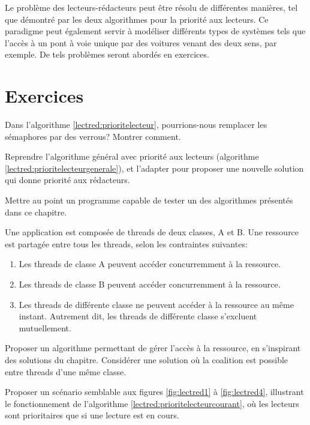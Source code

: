 Le problème des lecteurs-rédacteurs peut être résolu de différentes manières, tel que démontré par les deux algorithmes pour la priorité aux lecteurs. Ce paradigme peut également servir à modéliser différents types de systèmes tels que l'accès à un pont à voie unique par des voitures venant des deux sens, par exemple. De tels problèmes seront abordés en exercices.


\section{Exercices}

\startexercice

Dans l'algorithme \ref{lectred:prioritelecteur}, pourrions-nous remplacer les sémaphores par des verrous? Montrer comment.

\startexercice

Reprendre l'algorithme général avec priorité aux lecteurs (algorithme \ref{lectred:prioritelecteurgenerale}), et l'adapter pour proposer une nouvelle solution qui donne priorité aux rédacteurs.

\startexercice

Mettre au point un programme capable de tester un des algorithmes présentés dans ce chapitre.

\startexercice

Une application est composée de threads de deux classes, A et B. Une ressource est partagée entre tous les threads, selon les contraintes suivantes:
\begin{enumerate}
  \item Les threads de classe A peuvent accéder concurremment  à la ressource.
  \item Les threads de classe B peuvent accéder concurremment à la ressource.
  \item Les threads de différente classe ne peuvent accéder à la ressource au même instant. Autrement dit, les threads de différente classe s'excluent mutuellement.
\end{enumerate}

Proposer un algorithme permettant de gérer l'accès à la ressource, en s'inspirant des solutions du chapitre. Considérer une solution où la coalition est possible entre threads d'une même classe.


\startexercice

Proposer un scénario semblable aux figures \ref{fig:lectred1} à \ref{fig:lectred4}, illustrant le fonctionnement de l'algorithme
\ref{lectred:prioritelecteurcourant}, où les lecteurs sont prioritaires que si une lecture est en cours.
